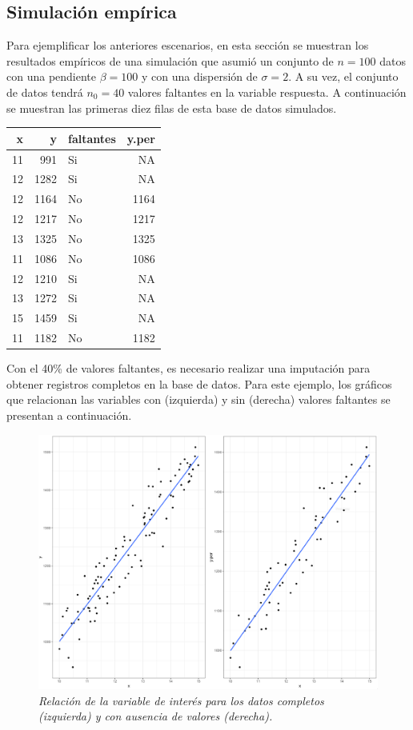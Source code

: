 \documentclass[
  10pt,
  spanish,
]{book}
\begin{document}
\hypertarget{simulaciuxf3n-empuxedrica}{%
\subsection{Simulación empírica}\label{simulaciuxf3n-empuxedrica}}

Para ejemplificar los anteriores escenarios, en esta sección se muestran los resultados empíricos de una simulación que asumió un conjunto de \(n = 100\) datos con una pendiente \(\beta = 100\) y con una dispersión de \(\sigma = 2\). A su vez, el conjunto de datos tendrá \(n_0 = 40\) valores faltantes en la variable respuesta. A continuación se muestran las primeras diez filas de esta base de datos simulados.

\begin{longtable}[]{@{}rrlr@{}}
\toprule
x & y & faltantes & y.per \\
\midrule
\endhead
11 & 991 & Si & NA \\
12 & 1282 & Si & NA \\
12 & 1164 & No & 1164 \\
12 & 1217 & No & 1217 \\
13 & 1325 & No & 1325 \\
11 & 1086 & No & 1086 \\
12 & 1210 & Si & NA \\
13 & 1272 & Si & NA \\
15 & 1459 & Si & NA \\
11 & 1182 & No & 1182 \\
\bottomrule
\end{longtable}

Con el 40\% de valores faltantes, es necesario realizar una imputación para obtener registros completos en la base de datos. Para este ejemplo, los gráficos que relacionan las variables con (izquierda) y sin (derecha) valores faltantes se presentan a continuación.

\begin{figure}
\centering
\includegraphics{Pics/im1.png}
\caption{\emph{Relación de la variable de interés para los datos completos (izquierda) y con ausencia de valores (derecha).}}
\end{figure}
\end{document}

